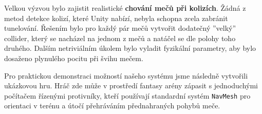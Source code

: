 Velkou výzvou bylo zajistit realistické \textbf{chování mečů při kolizích}. Žádná z metod detekce kolizí, které Unity nabízí, nebyla schopna zcela zabránit tunelování. Řešením bylo pro každý pár mečů vytvořit dodatečný ''velký'' collider, který se nacházel na jednom z mečů a natáčel se dle polohy toho druhého. Dalším netriviálním úkolem bylo vyladit fyzikální parametry, aby bylo dosaženo plynulého pocitu při švihu mečem. 

Pro praktickou demonstraci možností našeho systému jsme následně vytvořili ukázkovou hru. Hráč zde může v prostředí fantasy arény zápasit s jednoduchými počítačem řízenými protivníky, kteří používají standardní systém \texttt{NavMesh} pro orientaci v terénu a útočí přehráváním přednahraných pohybů meče. 
